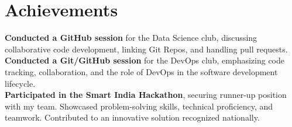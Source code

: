 \section{Achievements}
  \vspace{2pt}
  \resumeSubHeadingListStart
    \small{\item{
      \textbf{Conducted a GitHub session} for the Data Science club, discussing collaborative code development, linking Git Repos, and handling pull requests.\\ \vspace{3pt}
      \textbf{Conducted a Git/GitHub session} for the DevOps club, emphasizing code tracking, collaboration, and the role of DevOps in the software development lifecycle.\\ \vspace{3pt}
      \textbf{Participated in the Smart India Hackathon}, securing runner-up position with my team. Showcased problem-solving skills, technical proficiency, and teamwork. Contributed to an innovative solution recognized nationally.

    }}
  \resumeSubHeadingListEnd
